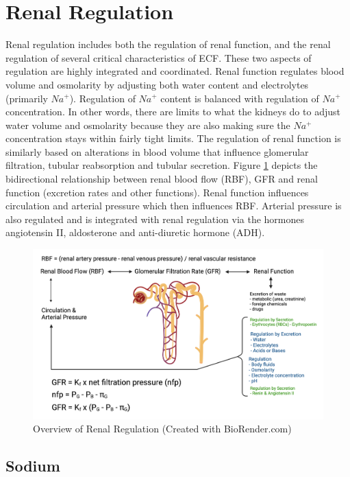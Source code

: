 \section{Renal Regulation}

Renal regulation includes both the regulation of renal function, and the renal regulation of several critical characteristics of ECF. These two aspects of regulation are highly integrated and coordinated. Renal function regulates blood volume and osmolarity by adjusting both water content and electrolytes (primarily $Na^+$). Regulation of $Na^+$ content is balanced with regulation of $Na^+$ concentration. In other words, there are limits to what the kidneys do to adjust water volume and osmolarity because they are also making sure the $Na^+$ concentration stays within fairly tight limits. The regulation of renal function is similarly based on alterations in blood volume that influence glomerular filtration, tubular reabsorption and tubular secretion. Figure \ref{fig:renal_regulation_intro} depicts the bidirectional relationship between renal blood flow (RBF), GFR and renal function (excretion rates and other functions). Renal function influences circulation and arterial pressure which then influences RBF. Arterial pressure is also regulated and is integrated with renal regulation via the hormones angiotensin II, aldosterone and anti-diuretic hormone (ADH). 

\begin{figure}[!h]
    \centering
    \includegraphics[width=1\linewidth]{./figure/renal_regulation_intro.png}
    \caption{Overview of Renal Regulation \footnotesize{(Created with BioRender.com)}}
    \label{fig:renal_regulation_intro}
\end{figure}


\subsection{Sodium}

